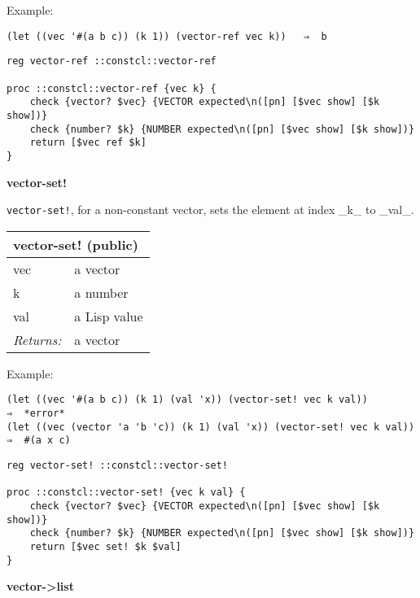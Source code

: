\documentclass{report}
\begin{document}
Example:

\noindent\makebox[\linewidth]{\rule{\linewidth}{0.4pt}}
\begin{lstlisting}
(let ((vec '#(a b c)) (k 1)) (vector-ref vec k))   ⇒  b
\end{lstlisting}
\noindent\makebox[\linewidth]{\rule{\linewidth}{0.4pt}}
\noindent\makebox[\linewidth]{\rule{\linewidth}{0.4pt}}
\begin{lstlisting}
reg vector-ref ::constcl::vector-ref
 
proc ::constcl::vector-ref {vec k} {
    check {vector? $vec} {VECTOR expected\n([pn] [$vec show] [$k show])}
    check {number? $k} {NUMBER expected\n([pn] [$vec show] [$k show])}
    return [$vec ref $k]
}
\end{lstlisting}
\noindent\makebox[\linewidth]{\rule{\linewidth}{0.4pt}}

\textbf{vector-set!}


\texttt{vector-set!}, for a non-constant vector, sets the element at index \_k\_ to \_val\_.

\begin{tabular}{ |l l| }
\hline
\multicolumn{2}{|l|}{vector-set! (public)} \\
\hline
vec & a vector \\
k & a number \\
val & a Lisp value \\
\textit{Returns:} & a vector \\
\hline
\end{tabular}


Example:

\noindent\makebox[\linewidth]{\rule{\linewidth}{0.4pt}}
\begin{lstlisting}
(let ((vec '#(a b c)) (k 1) (val 'x)) (vector-set! vec k val))           ⇒  *error*
(let ((vec (vector 'a 'b 'c)) (k 1) (val 'x)) (vector-set! vec k val))   ⇒  #(a x c)
\end{lstlisting}
\noindent\makebox[\linewidth]{\rule{\linewidth}{0.4pt}}
\noindent\makebox[\linewidth]{\rule{\linewidth}{0.4pt}}
\begin{lstlisting}
reg vector-set! ::constcl::vector-set!
 
proc ::constcl::vector-set! {vec k val} {
    check {vector? $vec} {VECTOR expected\n([pn] [$vec show] [$k show])}
    check {number? $k} {NUMBER expected\n([pn] [$vec show] [$k show])}
    return [$vec set! $k $val]
}
\end{lstlisting}
\noindent\makebox[\linewidth]{\rule{\linewidth}{0.4pt}}

\textbf{vector->list}
\end{document}
